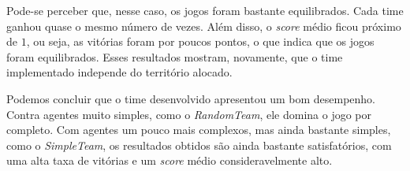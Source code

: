 \documentclass[a4paper,12pt]{article}
\begin{document}
Pode-se perceber que, nesse caso, os jogos foram bastante equilibrados. Cada time ganhou quase o mesmo
número de vezes. Além disso, o \textit{score} médio ficou próximo de $1$, ou seja, as vitórias foram
por poucos pontos, o que indica que os jogos foram equilibrados. Esses resultados mostram, novamente,
que o time implementado independe do território alocado.

Podemos concluir que o time desenvolvido apresentou um bom desempenho. Contra agentes muito simples,
como o \textit{RandomTeam}, ele domina o jogo por completo. Com agentes um pouco mais complexos,
mas ainda bastante simples, como o \textit{SimpleTeam}, os resultados obtidos são ainda bastante
satisfatórios, com uma alta taxa de vitórias e um \textit{score} médio consideravelmente alto.
\end{document}
